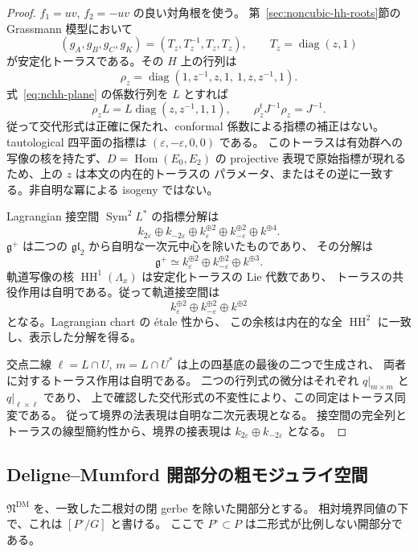 \begin{proof}
$f_1=uv$, $f_2=-uv$ の良い対角根を使う。
第~\ref{sec:noncubic-hh-roots}節の Grassmann 模型において
\[
 (g_A,g_B,g_C,g_K)=(T_z,T_z^{-1},T_z,T_z),
 \qquad T_z=\operatorname{diag}(z,1)
\]
が安定化トーラスである。その $H$ 上の行列は
\[
 \rho_z=\operatorname{diag}
 (1,z^{-1},z,1,\ 1,z,z^{-1},1).
\]
式~\ref{eq:nchh-plane} の係数行列を $L$ とすれば
\[
 \rho_zL=L\operatorname{diag}(z,z^{-1},1,1),
 \qquad\rho_z^tJ^{-1}\rho_z=J^{-1}.
\]
従って交代形式は正確に保たれ、conformal 係数による指標の補正はない。
tautological 四平面の指標は $(\varepsilon,-\varepsilon,0,0)$ である。
このトーラスは有効群への写像の核を持たず、$D=\operatorname{Hom}(E_0,E_2)$
の projective 表現で原始指標が現れるため、上の $z$ は本文の内在的トーラスの
パラメータ、またはその逆に一致する。非自明な冪による isogeny ではない。

Lagrangian 接空間 $\operatorname{Sym}^2L^*$ の指標分解は
\[
 k_{2\varepsilon}\oplus k_{-2\varepsilon}
 \oplus k_\varepsilon^{\oplus2}\oplus k_{-\varepsilon}^{\oplus2}
 \oplus k^{\oplus4}.
\]
$\mathfrak g^+$ は二つの $\mathfrak{gl}_2$ から自明な一次元中心を除いたものであり、
その分解は
\[
 \mathfrak g^+
 \simeq k_\varepsilon^{\oplus2}\oplus k_{-\varepsilon}^{\oplus2}\oplus k^{\oplus3}.
\]
軌道写像の核 $\operatorname{HH}^1(\Lambda_x)$ は安定化トーラスの Lie 代数であり、
トーラスの共役作用は自明である。従って軌道接空間は
\[
 k_\varepsilon^{\oplus2}\oplus k_{-\varepsilon}^{\oplus2}\oplus k^{\oplus2}
\]
となる。Lagrangian chart の \texorpdfstring{\'etale}{etale} 性から、
この余核は内在的な全 $\operatorname{HH}^2$ に一致し、表示した分解を得る。

交点二線 $\ell=L\cap U$, $m=L\cap U^*$ は上の四基底の最後の二つで生成され、
両者に対するトーラス作用は自明である。
二つの行列式の微分はそれぞれ $q|_{m\times m}$ と $q|_{\ell\times\ell}$ であり、
上で確認した交代形式の不変性により、この同定はトーラス同変である。
従って境界の法表現は自明な二次元表現となる。
接空間の完全列とトーラスの線型簡約性から、境界の接表現は
$k_{2\varepsilon}\oplus k_{-2\varepsilon}$ となる。
\end{proof}

\subsection{Deligne--Mumford 開部分の粗モジュライ空間}

$\mathfrak N^{\mathrm{DM}}$ を、一致した二根対の閉 gerbe を除いた開部分とする。
相対境界同値の下で、これは $[P^\circ/G]$ と書ける。
ここで $P^\circ\subset P$ は二形式が比例しない開部分である。


